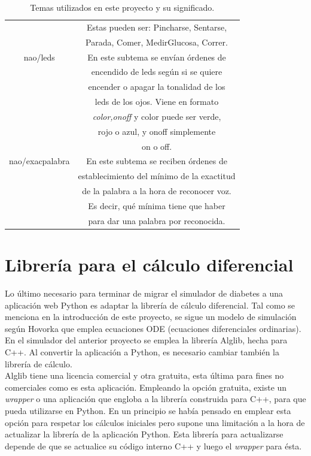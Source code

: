 \documentclass[12pt,spanish,listoffigures,listoftables]{tfgetsinf}
\begin{document}
\begin{table}[!h]
\begin{center}
\begin{tabular}{|c|c|}
	& Estas pueden ser: Pincharse, Sentarse, \\
	& Parada, Comer, MedirGlucosa, Correr. \\ 
	\hline 
	nao/leds & En este subtema se envían órdenes de \\
	& encendido de leds según si se quiere \\
	& encender o apagar la tonalidad de los \\
	& leds de los ojos. Viene en formato \\
	& \textit{color,onoff} y color puede ser verde, \\
	& rojo o azul, y onoff simplemente \\
	& on o off. \\ 
	\hline 
	nao/exacpalabra & En este subtema se reciben órdenes de \\
	& establecimiento del mínimo de la exactitud \\
	& de la palabra a la hora de reconocer voz. \\
	& Es decir, qué mínima tiene que haber \\
	& para dar una palabra por reconocida. \\ 
	\hline 
\end{tabular} 
\caption{Temas utilizados en este proyecto y su significado.}
\label{tabla:topicsmqtt}
\end{center}
\end{table}

\newpage
\section{Librería para el cálculo diferencial}

Lo último necesario para terminar de migrar el simulador de diabetes a una aplicación web Python es adaptar la librería de cálculo diferencial. Tal como se menciona en la introducción de este proyecto, se sigue un modelo de simulación según Hovorka que emplea ecuaciones ODE (ecuaciones diferenciales ordinarias). En el simulador del anterior proyecto se emplea la librería Alglib, hecha para C++. Al convertir la aplicación a Python, es necesario cambiar también la librería de cálculo. \\

Alglib \cite{Alglib} tiene una licencia comercial y otra gratuita, esta última para fines no comerciales como es esta aplicación. Empleando la opción gratuita, existe un \textit{wrapper} o una aplicación que engloba a la librería construida para C++, para que pueda utilizarse en Python. En un principio se había pensado en emplear esta opción para respetar los cálculos iniciales pero supone una limitación a la hora de actualizar la librería de la aplicación Python. Esta librería para actualizarse depende de que se actualice su código interno C++ y luego el \textit{wrapper} para ésta. \\
\end{document}
